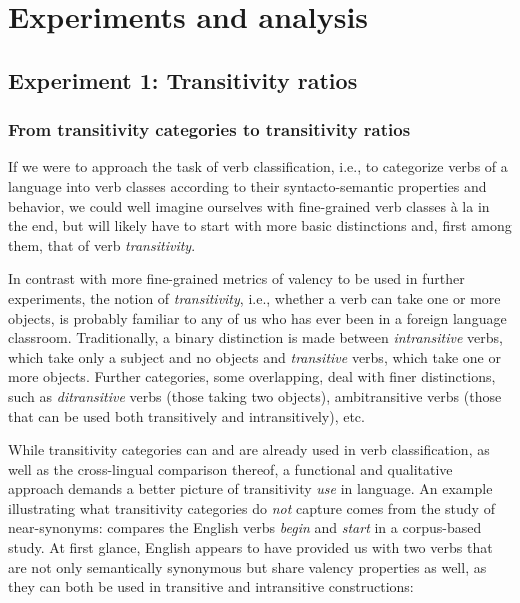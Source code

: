\chapter{Experiments and analysis}
\section{Experiment 1: Transitivity ratios}\label{sec:exp1}
\subsection{From transitivity categories to transitivity ratios}
If we were to approach the task of verb classification, i.e., to categorize verbs of a language into verb classes according to their syntacto-semantic properties and behavior, we could well imagine ourselves with fine-grained verb classes à la \citet{levin1993} in the end, but will likely have to start with more basic distinctions and, first among them, that of verb \textit{transitivity}. 

In contrast with more fine-grained metrics of valency to be used in further experiments, the notion of \textit{transitivity}, i.e., whether a verb can take one or more objects, is probably familiar to any of us who has ever been in a foreign language classroom. Traditionally, a binary distinction is made between \textit{intransitive} verbs, which take only a subject and no objects and \textit{transitive} verbs, which take one or more objects. Further categories, some overlapping, deal with finer distinctions, such as \textit{ditransitive} verbs (those taking two objects), ambitransitive verbs (those that can be used both transitively and intransitively), etc.

While transitivity categories can and are already used in verb classification, as well as the cross-lingual comparison thereof, a functional and qualitative approach demands a better picture of transitivity \textit{use} in language. An example illustrating what transitivity categories do \textit{not} capture comes from the study of near-synonyms: \citep{biber1998} compares the English verbs \textit{begin} and \textit{start} in a corpus-based study. At first glance, English appears to have provided us with two verbs that are not only semantically synonymous but share valency properties as well, as they can both be used in transitive and intransitive constructions:

